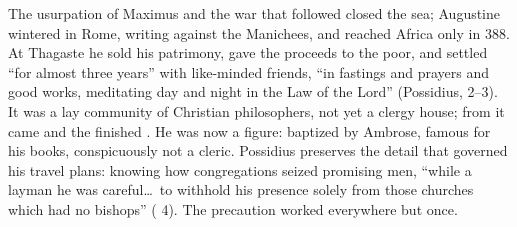 The usurpation of Maximus and the war that followed closed the sea; Augustine
wintered in Rome, writing against the Manichees, and reached Africa only in
388. At Thagaste he sold his patrimony, gave the proceeds to the poor, and
settled ``for almost three years'' with like-minded friends, ``in fastings
and prayers and good works, meditating day and night in the Law of the
Lord'' (Possidius,  2--3). It was a lay community of Christian
philosophers, not yet a clergy house; from it came 
and the finished . He was now a figure: baptized by
Ambrose, famous for his books, conspicuously not a cleric. Possidius
preserves the detail that governed his travel plans: knowing how
congregations seized promising men, ``while a layman he was careful\ldots\ to
withhold his presence solely from those churches which had no bishops''
( 4). The precaution worked everywhere but once.
